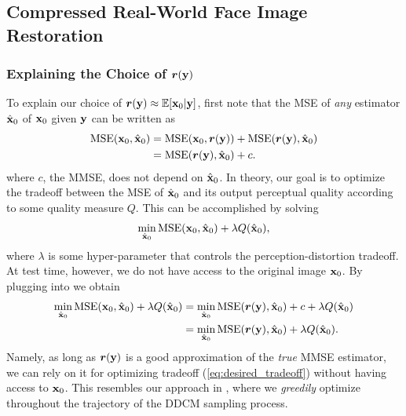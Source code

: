 \subsection{Compressed Real-World Face Image Restoration}\label{app:dmax-ot}
\subsubsection{Explaining the Choice of ${\bm{r}}({\mathbf{y}})$}
To explain our choice of ${\bm{r}}({\mathbf{y}})\approx\mathbb{E}[{\mathbf{x}}_{0}|{\mathbf{y}}]$, first note that the MSE of \emph{any} estimator $\hat{{\mathbf{x}}}_{0}$ of ${\mathbf{x}}_{0}$ given ${\mathbf{y}}$ can be written as~\citep{freirich2021a}
\begin{align}
    \text{MSE}({\mathbf{x}}_{0},\hat{{\mathbf{x}}}_{0})
    &=\text{MSE}({\mathbf{x}}_{0},{\bm{r}}({\mathbf{y}}))+\text{MSE}({\bm{r}}({\mathbf{y}}),\hat{{\mathbf{x}}}_{0})\nonumber\\
    &=\text{MSE}({\bm{r}}({\mathbf{y}}),\hat{{\mathbf{x}}}_{0})+c\label{eq:orthogonality}.
\end{align}
where $c$, the MMSE, does not depend on $\hat{{\mathbf{x}}}_{0}$.
In theory, our goal is to optimize the tradeoff between the MSE of $\hat{{\mathbf{x}}}_0$ and its output perceptual quality according to some quality measure $Q$. This can be accomplished by solving
\begin{align}\label{eq:desired_tradeoff}
    \min_{\hat{{\mathbf{x}}}_{0}}\text{MSE}({\mathbf{x}}_{0},\hat{{\mathbf{x}}}_{0})+\lambda Q(\hat{{\mathbf{x}}}_{0}),
\end{align}
where $\lambda$ is some hyper-parameter that controls the perception-distortion tradeoff.
At test time, however, we do not have access to the original image ${\mathbf{x}}_0$.
By plugging  into  we obtain
\begin{align}
    \min_{\hat{{\mathbf{x}}}_{0}}\text{MSE}({\mathbf{x}}_{0},\hat{{\mathbf{x}}}_{0})+\lambda Q(\hat{{\mathbf{x}}}_{0})&=\min_{\hat{{\mathbf{x}}}_{0}}\text{MSE}({\bm{r}}({\mathbf{y}}),\hat{{\mathbf{x}}}_{0})+c+\lambda Q(\hat{{\mathbf{x}}}_{0})\nonumber\\
    &=\min_{\hat{{\mathbf{x}}}_{0}}\text{MSE}({\bm{r}}({\mathbf{y}}),\hat{{\mathbf{x}}}_{0})+\lambda Q(\hat{{\mathbf{x}}}_{0}).\label{eq:opt-mse-real-world}
\end{align}
Namely, as long as ${\bm{r}}({\mathbf{y}})$ is a good approximation of the \emph{true} MMSE estimator, we can rely on it for optimizing tradeoff (\ref{eq:desired_tradeoff}) without having access to ${\mathbf{x}}_{0}$.
This resembles our approach in , where we \emph{greedily} optimize  throughout the trajectory of the DDCM sampling process.



